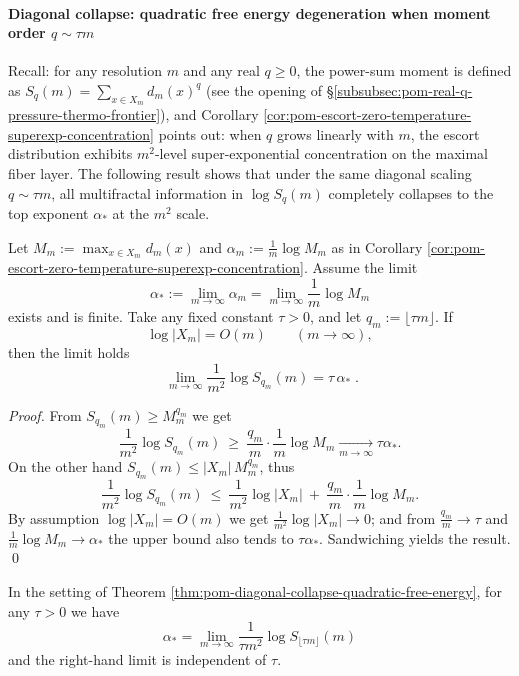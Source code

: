 
\paragraph{Diagonal collapse: quadratic free energy degeneration when moment order \(q\sim \tau m\)}
Recall: for any resolution \(m\) and any real \(q\ge 0\), the power-sum moment is defined as
\(
S_q(m)=\sum_{x\in X_m} d_m(x)^q
\)
(see the opening of \S\ref{subsubsec:pom-real-q-pressure-thermo-frontier}), and Corollary \ref{cor:pom-escort-zero-temperature-superexp-concentration} points out:
when \(q\) grows linearly with \(m\), the escort distribution exhibits \(m^2\)-level super-exponential concentration on the maximal fiber layer.
The following result shows that under the same diagonal scaling \(q\sim \tau m\),
all multifractal information in \(\log S_q(m)\) completely collapses to the top exponent \(\alpha_\ast\) at the \(m^2\) scale.

\begin{theorem}\label{thm:pom-diagonal-collapse-quadratic-free-energy}
Let
\(
M_m:=\max_{x\in X_m}d_m(x)
\)
and
\(
\alpha_m:=\frac{1}{m}\log M_m
\)
as in Corollary \ref{cor:pom-escort-zero-temperature-superexp-concentration}.
Assume the limit
\[
\alpha_\ast:=\lim_{m\to\infty}\alpha_m=\lim_{m\to\infty}\frac{1}{m}\log M_m
\]
exists and is finite.
Take any fixed constant \(\tau>0\), and let \(q_m:=\lfloor\tau m\rfloor\).
If
\[
\log|X_m|=O(m)\qquad(m\to\infty),
\]
then the limit holds
\[
\boxed{\;
\lim_{m\to\infty}\frac{1}{m^2}\log S_{q_m}(m)=\tau\,\alpha_\ast\; }.
\]
\end{theorem}
\begin{proof}
From \(S_{q_m}(m)\ge M_m^{q_m}\) we get
\[
\frac{1}{m^2}\log S_{q_m}(m)\ \ge\ \frac{q_m}{m}\cdot \frac{1}{m}\log M_m
\xrightarrow[m\to\infty]{}\tau\alpha_\ast.
\]
On the other hand \(S_{q_m}(m)\le |X_m|\,M_m^{q_m}\), thus
\[
\frac{1}{m^2}\log S_{q_m}(m)
\ \le\
\frac{1}{m^2}\log|X_m|
\ +\
\frac{q_m}{m}\cdot\frac{1}{m}\log M_m.
\]
By assumption \(\log|X_m|=O(m)\) we get \(\frac{1}{m^2}\log|X_m|\to 0\);
and from \(\frac{q_m}{m}\to\tau\) and \(\frac{1}{m}\log M_m\to\alpha_\ast\) the upper bound also tends to \(\tau\alpha_\ast\).
Sandwiching yields the result. \qed
\end{proof}

\begin{corollary}\label{cor:pom-diagonal-extract-alpha-star}
In the setting of Theorem \ref{thm:pom-diagonal-collapse-quadratic-free-energy}, for any \(\tau>0\) we have
\[
\boxed{\;
\alpha_\ast=\lim_{m\to\infty}\frac{1}{\tau m^2}\log S_{\lfloor\tau m\rfloor}(m)\;}
\]
and the right-hand limit is independent of \(\tau\).
\end{corollary}

